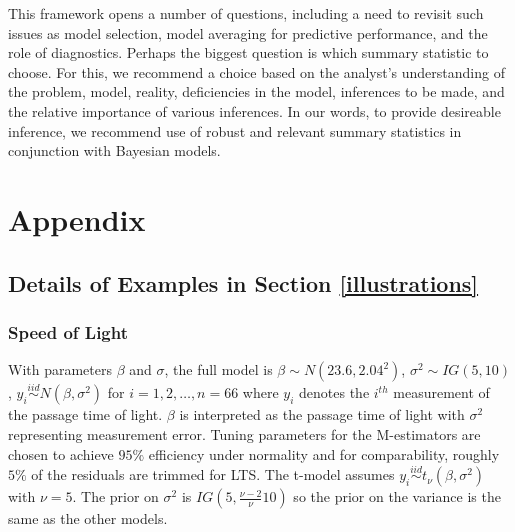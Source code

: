 \documentclass[11pt]{article}
\newcommand{\iid}{\stackrel{iid}{\sim}}
\newcommand{\green}[1]{{\color{green}#1}}
\begin{document}
This framework opens a number of questions, including a need to revisit such issues as model selection, model averaging for predictive performance, and the role of diagnostics.  Perhaps the biggest question is which summary statistic to choose.  For this, we recommend a choice based on the analyst's understanding of the problem, model, reality, deficiencies in the model,  inferences to be made, and the relative importance of various inferences.  \green{In our words, to provide desireable inference, we recommend use of robust and relevant summary statistics in conjunction with Bayesian models.}  


\section{Appendix}
\label{sec:appendix}

\subsection{Details of Examples in Section \ref{illustrations}}
\subsubsection{Speed of Light}
With parameters $\beta$ and $\sigma$, the full model is $\beta\sim N(23.6, 2.04^{2})$, $\sigma^{2}\sim IG(5, 10)$, $y_{i}\iid N (\beta, \sigma^{2})$ for $i=1,2,\dots, n=66$ where $y_{i}$ denotes the $i^{th}$ measurement of the passage time of light. $\beta$ is interpreted as the passage time of light with
$\sigma^{2}$ representing measurement error. Tuning parameters for the M-estimators are chosen to achieve $95\%$ efficiency under normality and for comparability, roughly $5\%$ of the residuals are trimmed for LTS.  The t-model assumes $y_{i}\iid t_{\nu} (\beta, \sigma^{2})$ with $\nu=5$. The prior on $\sigma^{2}$ is $IG(5, \frac{\nu-2}{\nu}10)$ so the prior on the variance is the same as the other models. %
\end{document}
